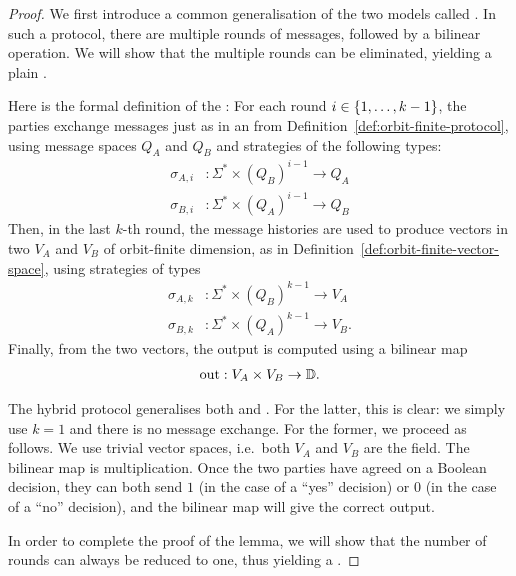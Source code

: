 \begin{proof}
  \AP
    We first introduce a common generalisation of the two models called . 
    In such a protocol, there are multiple rounds of messages, 
    followed by a bilinear operation. We will show that the multiple rounds can be eliminated,
    yielding a plain .
    
    Here is the formal definition of the :
    For each round $i \in \{1, \ldots, k-1\}$, the parties exchange messages just as in an 
     from Definition~\ref{def:orbit-finite-protocol}, 
    using message spaces $Q_A$ and $Q_B$ and strategies of the following types: 
        \begin{align*}
        \sigma_{A,i} & : \Sigma^* \times (Q_B)^{i-1} \to Q_A\\
        \sigma_{B,i} & : \Sigma^* \times (Q_A)^{i-1} \to Q_B
        \end{align*}
    Then, in  the last $k$-th round, the message histories are used to produce vectors 
    in two  $V_A$ and $V_B$ of orbit-finite dimension, 
    as in Definition~\ref{def:orbit-finite-vector-space}, using strategies 
    of types
    \begin{align*}
        \sigma_{A,k} & : \Sigma^* \times (Q_B)^{k-1} \to V_A\\
        \sigma_{B,k} & : \Sigma^* \times (Q_A)^{k-1} \to V_B.
        \end{align*}
    Finally, from the two vectors, the output is computed using a bilinear map
    \begin{align*}
        \text{out} : V_A \times V_B \to \mathbb D.
    \end{align*}
    

    The hybrid protocol generalises both  and 
    . 
    For the latter, this is clear: we simply use $k=1$ and there is no message exchange. 
    For the former, we proceed as follows.
    We use  trivial vector spaces, i.e.~both $V_A$ and $V_B$ are the field. 
    The bilinear map is multiplication. 
    Once the two parties have agreed on a Boolean decision, 
    they can both send $1$ (in the case of a ``yes'' decision) or $0$ (in the case of a ``no'' decision), 
    and the bilinear map will give the correct output. 
    
    In order to complete the proof of the lemma, we will show that the number
    of rounds can always be reduced to one, thus yielding a .


\end{proof}
